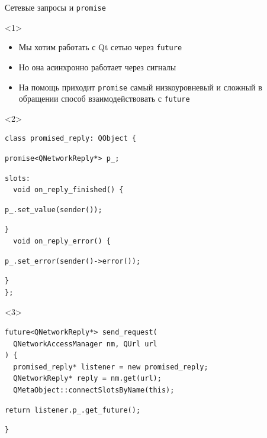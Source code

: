 \documentclass[aspectratio=169,hyperref={unicode},17pt]{beamer}
\begin{document}
\begin{frame}[fragile,t]{Сетевые запросы и \texttt{promise}}
\begin{onlyenv}<1>
\begin{itemize}
 \item Мы хотим работать с Qt сетью через \texttt{future}
 \item Но она асинхронно работает через сигналы
 \item На помощь приходит \texttt{promise} самый низкоуровневый и сложный в обращении способ взаимодействовать с \texttt{future}
\end{itemize}
\end{onlyenv}
\begin{onlyenv}<2>
\begin{lstlisting}[style=cppcode,aboveskip=0pt,belowskip=0pt]
class promised_reply: QObject {
\end{lstlisting}
\begin{lstlisting}[style=cppcode,backgroundcolor=\color{gray!30},aboveskip=0pt,belowskip=0pt]
  promise<QNetworkReply*> p_;
\end{lstlisting}
\begin{lstlisting}[style=cppcode,aboveskip=0pt,belowskip=0pt]
slots:
  void on_reply_finished() {
\end{lstlisting}
\begin{lstlisting}[style=cppcode,backgroundcolor=\color{gray!30},aboveskip=0pt,belowskip=0pt]
    p_.set_value(sender());
\end{lstlisting}
\begin{lstlisting}[style=cppcode,aboveskip=0pt,belowskip=0pt]
  }
  void on_reply_error() {
\end{lstlisting}
\begin{lstlisting}[style=cppcode,backgroundcolor=\color{gray!30},aboveskip=0pt,belowskip=0pt]
    p_.set_error(sender()->error());
\end{lstlisting}
\begin{lstlisting}[style=cppcode,aboveskip=0pt,belowskip=0pt]
  }
};
\end{lstlisting}
\end{onlyenv}
\begin{onlyenv}<3>
\begin{lstlisting}[style=cppcode,aboveskip=0pt,belowskip=0pt]
future<QNetworkReply*> send_request(
  QNetworkAccessManager nm, QUrl url
) {
  promised_reply* listener = new promised_reply;
  QNetworkReply* reply = nm.get(url);
  QMetaObject::connectSlotsByName(this);
\end{lstlisting}
\begin{lstlisting}[style=cppcode,backgroundcolor=\color{gray!30},aboveskip=0pt,belowskip=0pt]
  return listener.p_.get_future();
\end{lstlisting}
\begin{lstlisting}[style=cppcode,aboveskip=0pt,belowskip=0pt]
}
\end{lstlisting}
\end{onlyenv}
\end{frame}
\end{document}
